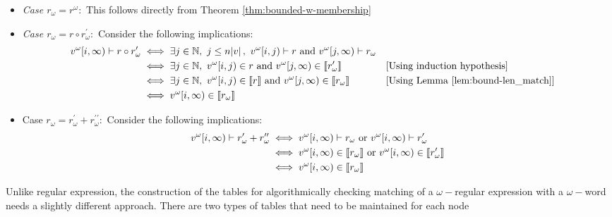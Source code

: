 \begin{itemize}[label=$-$]
\item \textit{Case $r_\omega=r^\omega:$} This follows directly from Theorem \ref{thm:bounded-w-membership}
\item \textit{Case $r_\omega=r\circ r^{\prime}_\omega:$} Consider the following implications:
\begin{align*}
    v^\omega[i,\infty) \vdash r\circ r^{\prime}_\omega &\iff \exists j\in \mathbb{N},\ j\leq n\abs{v},\ v^\omega[i,j)\vdash r \text{ and } v^\omega[j,\infty)\vdash r_\omega\\
    &\iff\exists j\in \mathbb{N},\ v^\omega[i,j)\in r \text{ and } v^\omega[j,\infty)\in {\llbracket}r_\omega^{\prime}{\rrbracket}&& \text{[Using induction hypothesis]}\\
    &\iff\exists j\in \mathbb{N},\ v^\omega[i,j)\in {\llbracket}r{\rrbracket} \text{ and } v^\omega[j,\infty)\in {\llbracket}r_\omega{\rrbracket}&& \text{[Using Lemma \ref{lem:bound-len_match}]}\\
    &\iff v^\omega[i,\infty)\in {\llbracket}r_\omega{\rrbracket}
\end{align*}
\item Case $r_\omega=r^{\prime}_\omega+r^{\prime\prime}_\omega:$ Consider the following implications:
\begin{align*}
        v^\omega[i,\infty) \vdash r^{\prime}_\omega + r^{\prime\prime}_\omega &\iff v^\omega[i,\infty)\vdash r_\omega \text{ or } v^\omega[i,\infty)\vdash r_\omega^{\prime}  \\
    &\iff v^\omega[i,\infty)\in {\llbracket}r_\omega{\rrbracket} \text{ or } v^\omega[i,\infty)\in {\llbracket}r_\omega^{\prime}{\rrbracket}\\
    &\iff v^\omega[i,\infty)\in {\llbracket}r_\omega{\rrbracket}
\end{align*}
\end{itemize}
Unlike regular expression, the construction of the tables for algorithmically checking matching of a $\omega-$regular expression with a $\omega-$word needs a slightly different approach. There are two types of tables that need to be maintained for each node 